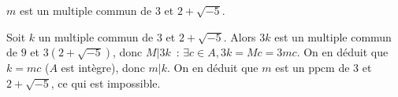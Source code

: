 {\begin{enumerate}
{\begin{itemize}
$m$ est un multiple commun de $3$ et $2+\sqrt{-5}$.

Soit $k$ un multiple commun de $3$ et $2+\sqrt{-5}$. Alors $3k$ est un
multiple commun de $9$ et $3(2+\sqrt{-5})$, donc $M|3k$~: $\exists c\in
A, 3k=Mc=3mc$. On en déduit que $k=mc$ ($A$ est intègre), donc $m|k$. On
en déduit que $m$ est un $\mathrm{ppcm}$ de $3$ et $2+\sqrt{-5}$, ce qui est
impossible.
  \end{itemize}
}
\end{enumerate}
}
